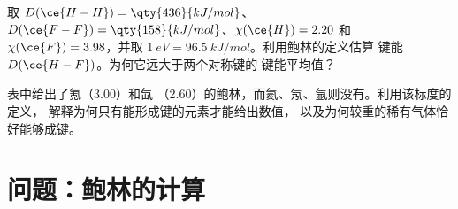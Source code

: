 \begin{exercise}[$\star\star\star$]\label{exo:b1:periodicity:11}
取 $D(\ce{H-H}) = \qty{436}{kJ/mol}$、$D(\ce{F-F}) =
\qty{158}{kJ/mol}$、$\chi(\ce{H}) = 2.20$ 和 $\chi(\ce{F}) = 3.98$，并取
$\qty{1}{eV} = \qty{96.5}{kJ/mol}$。利用鲍林的定义估算
键能 $D(\ce{H-F})$。为何它远大于两个对称键的
键能平均值？
\end{exercise}

\begin{exercise}[$\star\star\star$]\label{exo:b1:periodicity:12}
表中给出了氪（3.00）和氙
（2.60）的鲍林，而氦、氖、氩则没有。利用该标度的定义，
解释为何只有能形成键的元素才能给出数值，
以及为何较重的稀有气体恰好能够成键。
\end{exercise}

\section{问题：鲍林的计算}

